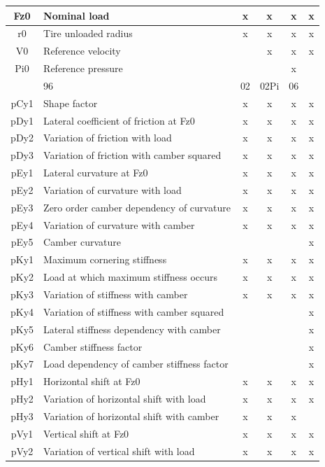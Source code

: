\begin{center}
\begin{longtable}[c]{|c|p{4in}|cccc|}
			Fz0	&Nominal load &x&x&x&x\\ \hline
			r0	&Tire unloaded radius	&x&x&x&x\\ \hline
			V0	&Reference velocity &&x&x&x\\ \hline
			Pi0	&Reference pressure &&&x&\\ \hline
			\rowcolor{ttblue}\multicolumn{2}{|c|}{\cellcolor{ttblue}\textbf{Pure Lateral}}&96&	02& 	02Pi&06\\ \hline
			pCy1	&Shape factor	&x	&x 	&x	&x\\ \hline
			pDy1	&Lateral coefficient of friction at Fz0	&x &x		&x	&x\\ \hline
			pDy2	&Variation of friction with load	&x	&x &x		&x\\ \hline
			pDy3	&Variation of friction with camber squared	&x 	&x	&x	&x\\ \hline
			pEy1	&Lateral curvature at Fz0	&x	&x 	&x	&x\\ \hline
			pEy2	&Variation of curvature with load	&x	&x	&x	&x\\ \hline
			pEy3	&Zero order camber dependency of curvature	&x &x		&x	&x\\ \hline
			pEy4	&Variation of curvature with camber	&x	&x	&x	&x\\ \hline
			pEy5	&Camber curvature				&&&&x\\ \hline
			pKy1	&Maximum cornering stiffness	&x	&x &x		&x\\ \hline
			pKy2	&Load at which maximum stiffness occurs	&x &x		&x	&x\\ \hline
			pKy3	&Variation of stiffness with camber	&x	&x	&x	&x\\ \hline
			pKy4	&Variation of stiffness with camber squared		&&&&x\\ \hline
			pKy5	&Lateral stiffness dependency with camber				&&&&x\\ \hline
			pKy6	&Camber stiffness factor				&&&&x\\ \hline
			pKy7	&Load dependency of camber stiffness factor				&&&&x\\ \hline
			pHy1	&Horizontal shift at Fz0	&x	&x &x	&x\\ \hline
			pHy2	&Variation of horizontal shift with load	&x &x	&x	&x\\ \hline
			pHy3	&Variation of horizontal shift with camber	&x &x		&x	&\\ \hline
			pVy1	&Vertical shift at Fz0	&x &x		&x	&x\\ \hline
			pVy2	&Variation of vertical shift with load	&x	&x 	&x	&x\\ \hline

\end{longtable}
\end{center}
